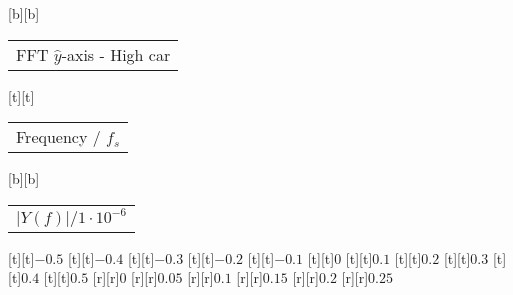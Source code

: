 %
%
[b][b]{\fontsize{8}{12}\selectfont \setlength{\tabcolsep}{0pt}\begin{tabular}{c}FFT $\hat{y}$-axis - High car\end{tabular}}%
[t][t]{\fontsize{8}{12}\selectfont \setlength{\tabcolsep}{0pt}\begin{tabular}{c}Frequency / $f_s$\end{tabular}}%
[b][b]{\fontsize{8}{12}\selectfont \setlength{\tabcolsep}{0pt}\begin{tabular}{c}$\vert{}Y(f)\vert{}/1\cdot{}10^{-6}$\end{tabular}}%
%
\fontsize{6}{8}%
\selectfont%
%
[t][t]{$-0.5$}%
[t][t]{$-0.4$}%
[t][t]{$-0.3$}%
[t][t]{$-0.2$}%
[t][t]{$-0.1$}%
[t][t]{$0$}%
[t][t]{$0.1$}%
[t][t]{$0.2$}%
[t][t]{$0.3$}%
[t][t]{$0.4$}%
[t][t]{$0.5$}%
%
[r][r]{$0$}%
[r][r]{$0.05$}%
[r][r]{$0.1$}%
[r][r]{$0.15$}%
[r][r]{$0.2$}%
[r][r]{$0.25$}%
%
%
